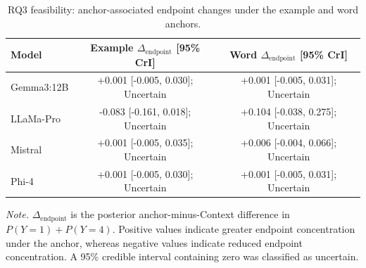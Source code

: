 \begin{table}[tbp]
\caption{RQ3 feasibility: anchor-associated endpoint changes under the example and word anchors.}
\label{tab:rq3-feasibility-anchor-patterns}
\begin{tabular}{lcc}
\toprule
Model & Example $\Delta_{\mathrm{endpoint}}$ [95\% CrI] & Word $\Delta_{\mathrm{endpoint}}$ [95\% CrI] \\
\midrule
Gemma3:12B & +0.001 [-0.005, 0.030]; Uncertain & +0.001 [-0.005, 0.031]; Uncertain \\
LLaMa-Pro & -0.083 [-0.161, 0.018]; Uncertain & +0.104 [-0.038, 0.275]; Uncertain \\
Mistral & +0.001 [-0.005, 0.035]; Uncertain & +0.006 [-0.004, 0.066]; Uncertain \\
Phi-4 & +0.001 [-0.005, 0.030]; Uncertain & +0.001 [-0.005, 0.031]; Uncertain \\
\bottomrule
\end{tabular}
\vspace{2pt}
\begin{minipage}{\linewidth}
\footnotesize\textit{Note.} $\Delta_{\mathrm{endpoint}}$ is the posterior anchor-minus-Context difference in $P(Y=1)+P(Y=4)$. Positive values indicate greater endpoint concentration under the anchor, whereas negative values indicate reduced endpoint concentration. A 95\% credible interval containing zero was classified as uncertain.
\end{minipage}
\end{table}

